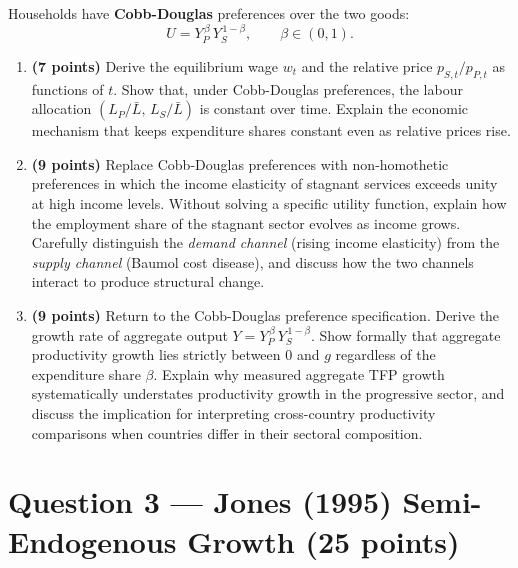 \documentclass[a4paper,11pt]{article}
\begin{document}
Households have \textbf{Cobb-Douglas} preferences over the two goods:
\[
    U = Y_P^{\,\beta}\,Y_S^{\,1-\beta}, \qquad \beta \in (0,1).
\]

\begin{enumerate}[label=\textbf{\arabic*.}, leftmargin=*, itemsep=8pt]

    \item \textbf{(7 points)} Derive the equilibrium wage $w_t$ and the relative price
    $p_{S,t}/p_{P,t}$ as functions of $t$.  Show that, under Cobb-Douglas preferences, the
    labour allocation $(L_P/\bar{L},\, L_S/\bar{L})$ is constant over time.  Explain the
    economic mechanism that keeps expenditure shares constant even as relative prices rise.

    \item \textbf{(9 points)} Replace Cobb-Douglas preferences with non-homothetic
    preferences in which the income elasticity of stagnant services exceeds unity at high
    income levels.  Without solving a specific utility function, explain how the employment
    share of the stagnant sector evolves as income grows.  Carefully distinguish the
    \emph{demand channel} (rising income elasticity) from the \emph{supply channel}
    (Baumol cost disease), and discuss how the two channels interact to produce structural
    change.

    \item \textbf{(9 points)} Return to the Cobb-Douglas preference specification.  Derive
    the growth rate of aggregate output $Y = Y_P^{\,\beta}\,Y_S^{\,1-\beta}$.  Show
    formally that aggregate productivity growth lies strictly between 0 and $g$ regardless
    of the expenditure share $\beta$.  Explain why measured aggregate TFP growth
    systematically understates productivity growth in the progressive sector, and discuss the
    implication for interpreting cross-country productivity comparisons when countries differ
    in their sectoral composition.

\end{enumerate}

\clearpage

\section{Question 3 --- Jones (1995) Semi-Endogenous Growth \hfill (25 points)}
\end{document}
